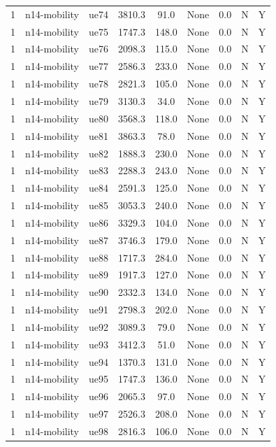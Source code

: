 \begin{table}[ht]
\begin{tabular}{|c|c|c|c|c|c|c|c|c|}
1 & n14-mobility & ue74 & 3810.3 & 91.0 & None & 0.0 & N & Y \\
1 & n14-mobility & ue75 & 1747.3 & 148.0 & None & 0.0 & N & Y \\
1 & n14-mobility & ue76 & 2098.3 & 115.0 & None & 0.0 & N & Y \\
1 & n14-mobility & ue77 & 2586.3 & 233.0 & None & 0.0 & N & Y \\
1 & n14-mobility & ue78 & 2821.3 & 105.0 & None & 0.0 & N & Y \\
1 & n14-mobility & ue79 & 3130.3 & 34.0 & None & 0.0 & N & Y \\
1 & n14-mobility & ue80 & 3568.3 & 118.0 & None & 0.0 & N & Y \\
1 & n14-mobility & ue81 & 3863.3 & 78.0 & None & 0.0 & N & Y \\
1 & n14-mobility & ue82 & 1888.3 & 230.0 & None & 0.0 & N & Y \\
1 & n14-mobility & ue83 & 2288.3 & 243.0 & None & 0.0 & N & Y \\
1 & n14-mobility & ue84 & 2591.3 & 125.0 & None & 0.0 & N & Y \\
1 & n14-mobility & ue85 & 3053.3 & 240.0 & None & 0.0 & N & Y \\
1 & n14-mobility & ue86 & 3329.3 & 104.0 & None & 0.0 & N & Y \\
1 & n14-mobility & ue87 & 3746.3 & 179.0 & None & 0.0 & N & Y \\
1 & n14-mobility & ue88 & 1717.3 & 284.0 & None & 0.0 & N & Y \\
1 & n14-mobility & ue89 & 1917.3 & 127.0 & None & 0.0 & N & Y \\
1 & n14-mobility & ue90 & 2332.3 & 134.0 & None & 0.0 & N & Y \\
1 & n14-mobility & ue91 & 2798.3 & 202.0 & None & 0.0 & N & Y \\
1 & n14-mobility & ue92 & 3089.3 & 79.0 & None & 0.0 & N & Y \\
1 & n14-mobility & ue93 & 3412.3 & 51.0 & None & 0.0 & N & Y \\
1 & n14-mobility & ue94 & 1370.3 & 131.0 & None & 0.0 & N & Y \\
1 & n14-mobility & ue95 & 1747.3 & 136.0 & None & 0.0 & N & Y \\
1 & n14-mobility & ue96 & 2065.3 & 97.0 & None & 0.0 & N & Y \\
1 & n14-mobility & ue97 & 2526.3 & 208.0 & None & 0.0 & N & Y \\
1 & n14-mobility & ue98 & 2816.3 & 106.0 & None & 0.0 & N & Y \\

\end{tabular}
\end{table}
